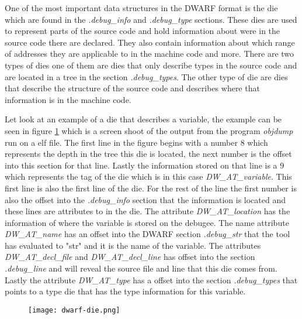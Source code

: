  


One of the most important data structures in the \gls{DWARF} format is the \gls{die} which are found in the \emph{.debug\_info} and \emph{.debug\_type} sections.
These \glspl{die} are used to represent parts of the source code and hold information about were in the source code there are declared.
They also contain information about which range of addresses they are applicable to in the machine code and more.
There are two types of \glspl{die} one of them are dies that only describe types in the source code and are located in a \gls{tree} in the section \emph{.debug\_types}.
The other type of \gls{die} are dies that describe the structure of the source code and describes where that information is in the machine code.


Let look at an example of a \gls{die} that describes a variable, the example can be seen in figure \ref{fig:dwarfdie} which is a screen shoot of the output from the program \emph{objdump} run on a \gls{elf} file.
The first line in the figure begins with a number $8$ which represents the depth in the tree this \gls{die} is located, the next number is the offset into this section for that line.
Lastly the information stored on that line is a $9$ which represents the tag of the \gls{die} which is in this case \emph{DW\_AT\_variable}.
This first line is also the first line of the die.
For the rest of the line the first number is also the offset into the \emph{.debug\_info} section that the information is located and these lines are attributes to in the \gls{die}.
The attribute \emph{DW\_AT\_location} has the information of where the variable is stored on the \gls{debugee}.
The name attribute \emph{DW\_AT\_name} has an offset into the \gls{DWARF} section \emph{.debug\_str} that the tool has evaluated to "str" and it is the name of the variable.
The attributes \emph{DW\_AT\_decl\_file} and \emph{DW\_AT\_decl\_line} has offset into the section \emph{.debug\_line} and will reveal the source file and line that this \gls{die} comes from.
Lastly the attribute \emph{DW\_AT\_type} has a offset into the section \emph{.debug\_types} that points to a type \gls{die} that has the type information for this variable.


\begin{figure}[h]
    \centering
    \texttt{[image: dwarf-die.png]}
    \label{fig:dwarfdie}
\end{figure}

